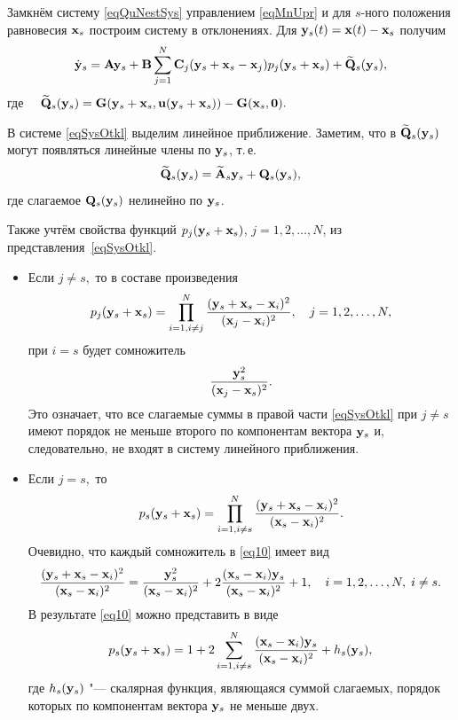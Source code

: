 Замкнём систему \eqref{eqQuNestSys} управлением \eqref{eqMnUpr} и
для $s$-ного положения равновесия ${\bf x}_s$ построим систему в
отклонениях. Для ${\bf y}_s(t)={\bf x}(t)-{\bf x}_s$ получим
\begin{equation}
\dot{\bf y}_s={\bf A}{\bf y}_s+{\bf B}\sum^N_{j=1}{\bf C}_j({\bf y}_s+{\bf x}_s-{\bf x}_j)
p_j({\bf y}_s+{\bf x}_s)+\widetilde{{\bf Q}}_s({\bf y}_s), \label{eqSysOtkl}
\end{equation}
где $\quad\widetilde{{\bf Q}}_s({\bf y}_s)=
{\bf G}({\bf y}_s+{\bf x}_s,{\bf u}({\bf y}_s+{\bf x}_s))- {\bf G}({\bf x}_s,\mathbf{0}).$

В системе \eqref{eqSysOtkl} выделим линейное приближение. Заметим,
что в $\widetilde{{\bf Q}}_s({\bf y}_s)$ могут появляться линейные члены
по ${\bf y}_s$, т.\,е.
$$\widetilde{{\bf Q}}_s({\bf y}_s)=\widetilde{{\bf A}}_s{\bf y}_s+{\bf Q}_s({\bf y}_s),$$
где слагаемое ${\bf Q}_s({\bf y}_s)$ нелинейно по ${\bf y}_s$.

Также учтём свойства функций $p_j({\bf y}_s+{\bf x}_s)$,
$j=1, 2, \dots, N$, из представления~\eqref{eqSysOtkl}.
\begin{itemize}
\item[1)] Если $j\neq{s},$ то в составе произведения
    $$p_j({\bf y}_s+{\bf x}_s)=\prod^N_{i=1,i\neq{j}}{({\bf y}_s+{\bf x}_s-{\bf x}_i)^2
    \over({\bf x}_j-{\bf x}_i)^2},\quad
    j=1, 2, \dots, N,$$
    при $i=s$ будет сомножитель $${{\bf y}_s^2\over({\bf x}_j-{\bf x}_s)^2}.$$
    Это означает, что все слагаемые суммы в правой части
    \eqref{eqSysOtkl} при \mbox{$j\neq{s}$} имеют порядок не меньше второго по
    компонентам вектора ${\bf y}_s$ и, следовательно, не входят
    в систему линейного приближения.

\item[2)] Если $j=s,$ то
    \begin{equation}
    p_s({\bf y}_s+{\bf x}_s)=\prod^N_{i=1,i\neq{s}}{({\bf y}_s+{\bf x}_s-{\bf x}_i)^2
    \over({\bf x}_s-{\bf x}_i)^2}.
    \label{eq10}
    \end{equation}
Очевидно, что каждый сомножитель в \eqref{eq10} имеет вид
$${{({\bf y}_s+{\bf x}_s-{\bf x}_i)^2}\over{({\bf x}_s-{\bf x}_i)^2}}=
    {{\bf y}_s^2\over{({\bf x}_s-{\bf x}_i)^2}}
    +2{({\bf x}_s-{\bf x}_i){\bf y}_s\over{(\mathbf{x}_s-\mathbf{x}_i)^2}}+1,
    \quad i=1, 2, \dots, N,\; i\neq{s}.$$
В результате \eqref{eq10} можно представить в виде
\begin{equation}
p_s({\bf y}_s+{\bf x}_s)=1+2\sum^N_{i=1,i\neq{s}}{({\bf x}_s-{\bf x}_i)
{\bf y}_s\over{({\bf x}_s-{\bf x}_i)^2}}+h_s({\bf y}_s), \label{eq11}
\end{equation}
где $h_s({\bf y}_s)$ "--- скалярная функция, являющаяся суммой
слагаемых, порядок которых по компонентам вектора ${\bf y}_s$ не
меньше двух.
\end{itemize}


